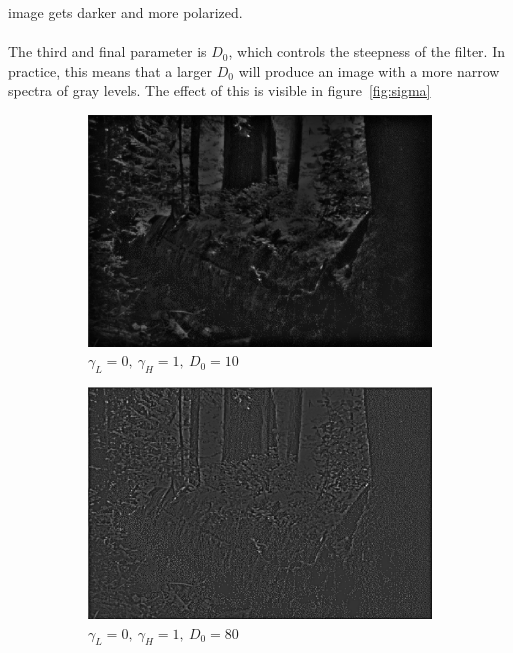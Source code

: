 		image gets darker and more polarized.
		\\
		\\
		The third and final parameter is $D_0$, which controls the steepness of the filter.
		In practice, this means that a larger $D_0$ will produce an image with a more 
		narrow spectra of gray levels. The effect of this is visible in figure~\ref{fig:sigma}
		\begin{figure}[h!]
			\centering
			\begin{subfigure}[b]{0.5\linewidth}
				\includegraphics[width=0.9\linewidth]{pics/low_sigma.png}
				\caption{$\gamma_L = 0,~\gamma_H = 1,~D_0 = 10$}
				\label{fig:low_sigma}
			\end{subfigure}%
			\begin{subfigure}[b]{0.5\linewidth}
				\includegraphics[width=0.9\linewidth]{pics/high_sigma.png}
				\caption{$\gamma_L = 0,~\gamma_H = 1,~D_0 =80$}
				\label{fig:high_sigma}
			\end{subfigure}
			\label{fig:sigma}
			\begin{subfigure}[b]{0.5\linewidth}

\end{subfigure}
\end{figure}
